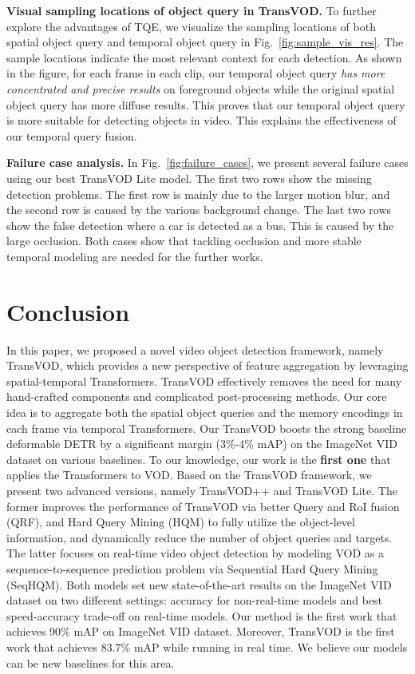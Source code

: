 \documentclass[10pt,journal,compsoc]{IEEEtran}
\begin{document}
\noindent \textbf{Visual sampling locations of object query in TransVOD.} To further explore the advantages of TQE, we visualize the sampling locations of both spatial object query and temporal object query in Fig.~\ref{fig:sample_vis_res}. The sample locations indicate the most relevant context for each detection. As shown in the figure, for each frame in each clip, our temporal object query \textit{has more concentrated and precise results} on foreground objects while the original spatial object query has more diffuse results. This proves that our temporal object query is more suitable for detecting objects in video. This explains the effectiveness of our temporal query fusion.



\noindent \textbf{Failure case analysis.}
In Fig.~\ref{fig:failure_cases}, we present several failure cases using our best TransVOD Lite model. The first two rows show the missing detection problems. The first row is mainly due to the larger motion blur, and the second row is caused by the various background change. The last two rows show the false detection where a car is detected as a bus. This is caused by the large occlusion. Both cases show that tackling occlusion and more stable temporal modeling are needed for the further works.

\section{Conclusion}
In this paper, we proposed a novel video object detection framework, namely TransVOD, which provides a new perspective of feature aggregation by leveraging spatial-temporal Transformers. TransVOD effectively removes the need for many hand-crafted components and complicated post-processing methods. Our core idea is to aggregate both the spatial object queries and the memory encodings in each frame via temporal Transformers. Our TransVOD boosts the strong baseline deformable DETR by a significant margin (3\%-4\% mAP) on the ImageNet VID dataset on various baselines. To our knowledge, our work is the \textbf{first one} that applies the Transformers to VOD. Based on the TransVOD framework, we present two advanced versions, namely TransVOD++ and TransVOD Lite. The former improves the performance of TransVOD via better Query and RoI fusion (QRF), and Hard Query Mining (HQM) to fully utilize the object-level information, and dynamically reduce the number of object queries and targets. The latter focuses on real-time video object detection by modeling VOD as a sequence-to-sequence prediction problem via Sequential Hard Query Mining (SeqHQM). Both models set new state-of-the-art results on the ImageNet VID dataset on two different settings: accuracy for non-real-time models and best speed-accuracy trade-off on real-time models. Our method is the first work that achieves 90$\%$ mAP on ImageNet VID dataset. Moreover, TransVOD is the first work that achieves 83.7\% mAP while running in real time. We believe our models can be new baselines for this area. 
\end{document}
